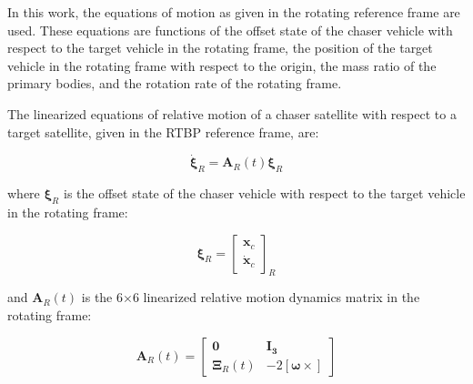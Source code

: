 \documentclass[a4paper]{article}
\begin{document}
In this work, the equations of motion as given in the rotating reference frame are used. These equations are functions of the offset state of the chaser vehicle with respect to the target vehicle in the rotating frame, the position of the target vehicle in the rotating frame with respect to the origin, the mass ratio of the primary bodies, and the rotation rate of the rotating frame.


The linearized equations of relative motion of a chaser satellite with respect to a target satellite, given in the RTBP reference frame, are:

\begin{equation} \label{eq:RelmoDerivs}
\dot{\boldsymbol{\xi}}_R = \mathbf{A}_R(t)\boldsymbol{\xi}_R
\end{equation}

where \(\boldsymbol{\xi}_R\) is the offset state of the chaser vehicle with respect to the target vehicle in the rotating frame:

\begin{equation*}  %
\boldsymbol{\xi}_R = \begin{bmatrix}
									\mathbf{x}_c \\
									\dot{\mathbf{x}}_c
									\end{bmatrix}_R
\end{equation*}

and  \(\mathbf{A}_R(t)\) is the 6\(\times\)6 linearized relative motion dynamics matrix in the rotating frame: %

\begin{equation} \label{eq:RelmoDynMatrix}
\mathbf{A}_R(t) = \begin{bmatrix}
								\mathbf{0}          & \mathbf{I_3} \\
								\mathbf{\Xi}_R(t) & -2 [\boldsymbol{\omega} \times]
								\end{bmatrix}
\end{equation}
\end{document}
